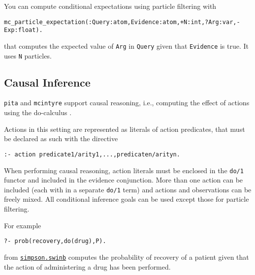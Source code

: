 You can compute conditional expectations using particle filtering with 
\begin{verbatim}
mc_particle_expectation(:Query:atom,Evidence:atom,+N:int,?Arg:var,-Exp:float).
\end{verbatim}
that computes the expected value of \verb|Arg| in \verb|Query| given that
\verb|Evidence| is true.
It uses \verb|N| particles.

\subsection{Causal Inference}
\label{causal}

\verb|pita| and \verb|mcintyre| support causal reasoning, i.e., computing the effect of actions using the
do-calculus \cite{Pea00-book}.

Actions in this setting are represented as literals of action predicates, that must be declared as such
with the directive 
\begin{verbatim}
:- action predicate1/arity1,...,predicaten/arityn.
\end{verbatim}
When performing causal reasoning, action literals must be enclosed in the \verb|do/1| functor and included in the evidence conjunction. More than one action can be included (each with in a separate
\verb|do/1| term) and actions and observations can be freely mixed.
All conditional inference goals can be used except those for particle filtering.

For example
\begin{verbatim} 
?- prob(recovery,do(drug),P).
\end{verbatim}
from \href{http://cplint.lamping.unife.it/example/inference/simpson.swinb}{\texttt{simpson.swinb}} 
computes the probability of recovery of a patient given that the action of administering a drug has
been performed.


